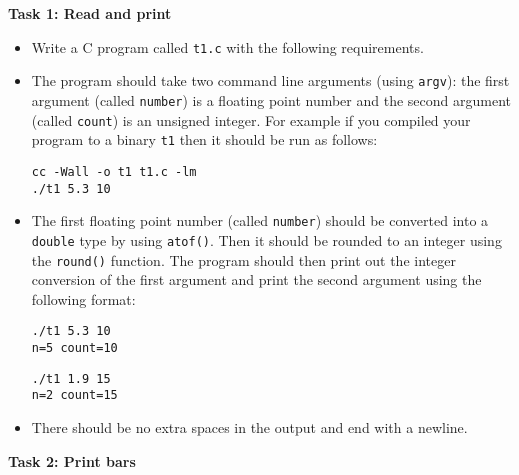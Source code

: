 \documentclass[11pt]{article}
\begin{document}
\begin{exe}

\ex \textbf{Task 1: Read and print}

\begin{itemize}\addtolength{\itemsep}{-0.3\baselineskip}

\item Write a C program called \texttt{t1.c} with the following requirements.

\item The program should take two command line arguments (using \texttt{argv}): 
the first argument (called \texttt{number}) is a floating point number and the 
second argument (called \texttt{count}) is an
unsigned integer. For example if you compiled your program to a binary \texttt{t1}
then it should be run as follows:

\footnotesize
\begin{verbatim}
cc -Wall -o t1 t1.c -lm
./t1 5.3 10
\end{verbatim}
\normalsize

\item The first floating point number (called \texttt{number}) should be 
converted into a \texttt{double} type by using \texttt{atof()}. 
Then it should be rounded to an integer using the \texttt{round()} 
function. The program should then print out the integer conversion of 
the first argument and print the second argument using the following
format:

\footnotesize
\smallskip
\begin{minipage}{2in}
\begin{verbatim}
./t1 5.3 10
n=5 count=10
\end{verbatim}
\end{minipage}
\begin{minipage}{2in}
\begin{verbatim}
./t1 1.9 15
n=2 count=15
\end{verbatim}
\end{minipage}

\bigskip
\normalsize

\item There should be no extra spaces in the output and end with a newline.

\end{itemize}

\ex \textbf{Task 2: Print bars}

\begin{itemize}\addtolength{\itemsep}{-0.3\baselineskip}


\end{itemize}
\end{exe}
\end{document}
